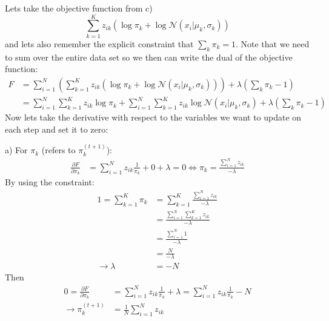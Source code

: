 Lets take the objective function from c)
\[
\sum_{k=1}^K z_{ik} \left(
		\log \pi_k + \log \mathcal{N}\left(x_i | \mu_k, \sigma_k \right)
	\right)
\]
and lets also remember the explicit constraint that $\sum_k \pi_k = 1$. Note that we need to sum over the entire data set so we then can write the dual of the objective function:
\begin{align*}
F &= \sum_{i=1}^N \left( \sum_{k=1}^K z_{ik} \left(
		\log \pi_k + \log \mathcal{N}\left(x_i | \mu_k, \sigma_k \right)
	\right) \right) + \lambda \left( \sum_k \pi_k - 1 \right)\\
&= \sum_{i=1}^N \sum_{k=1}^K z_{ik}\log \pi_k +
	\sum_{i=1}^N \sum_{k=1}^K z_{ik} \log \mathcal{N}\left(x_i | \mu_k, \sigma_k \right)
	 + \lambda \left( \sum_k \pi_k - 1 \right)
\end{align*}
Now lets take the derivative with respect to the variables we want to update on each step and set it to zero:

a) For $\pi_k$ (refers to $\pi_k^{(t+1)}$):
\begin{align*}
\frac{\partial F}{\partial \pi_k} &= \sum_{i=1}^N z_{ik} \frac{1}{\pi_k} + 0 + \lambda = 0 
\iff \pi_k = \frac{\sum_{i=1}^N z_{ik}}{-\lambda}
\end{align*}
By using the constraint:
\begin{align*}
1 = \sum_{k=1}^K \pi_k &= \sum_{k=1}^K \frac{\sum_{i=1}^N z_{ik}}{-\lambda}\\
&= \frac{\sum_{i=1}^N \sum_{k=1}^K z_{ik}}{-\lambda}\\
&= \frac{\sum_{i=1}^N 1}{-\lambda}\\
&= \frac{N}{-\lambda}\\
\rightarrow \lambda &= -N
\end{align*}
Then
\begin{align*}
0 = \frac{\partial F}{\partial \pi_k}  &= \sum_{i=1}^N z_{ik} \frac{1}{\pi_k} + \lambda = \sum_{i=1}^N z_{ik} \frac{1}{\pi_k} - N\\
\rightarrow \pi_k^{(t+1)} &= \frac{1}{N}\sum_{i=1}^N z_{ik}
\end{align*}

\pagebreak

\newcommand{\gaussian}{
	\left(2\pi \sigma_k^2\right)^{-\frac{1}{2}} \exp \left(
			-\frac{1}{2\sigma_k^2} \left( x_i - \mu_k \right)^2
		\right)
}

